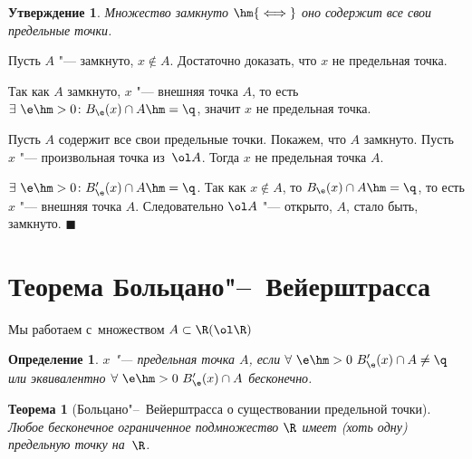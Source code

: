 \documentclass[a4paper,10pt,twoside]{article}
\newtheorem{Def}{Определение}[section]
\newtheorem{The}{Теорема}[section]
\newtheorem{Ut}{Утверждение}[section]
\newenvironment{Proof}
       {\par\noindent{\textbf{Доказательство.}}}
       {\hfill$\scriptstyle\blacksquare$}
\let\AVsection\section{}
\renewcommand\section{\newpage\scol\AVsection}
\newcommand{\scol}{  \renewcommand{\headrulewidth}{0.5pt}\fancyhead[RE,LO]{\thesection{} \leftmark} \fancyhead[LE,RO]{\thepage}}
\begin{document}
 \begin{Ut}
Множество замкнуто $\hm{\iff}$ оно содержит все свои предельные точки.
 \end{Ut}

 \begin{Proof}
Пусть $A$ "--- замкнуто, $x\nin A$. Достаточно доказать, что $x$ не предельная точка.

Так как $A$ замкнуто, $x$ "--- внешняя точка $A$, то есть
 $\exists\ \e\hm>0\colon B_\e(x)\cap A\hm=\q$, значит $x$ не предельная точка.

 Пусть $A$ содержит все свои предельные точки. Покажем, что $A$ замкнуто.
 Пусть $x$ "--- произвольная точка из~$\ol A$. Тогда $x$ не предельная точка $A$.

 $\exists\ \e\hm>0\colon B'_\e(x)\cap A\hm=\q$. Так как $x\nin A$, то $B_\e(x)\cap A\hm=\q$, то есть $x$ "--- внешняя точка $A$. Следовательно $\ol A$ "--- открыто, $A$, стало быть, замкнуто.
 \end{Proof}

 \section{Теорема Больцано"--~Вейерштрасса}

 Мы работаем с~множеством $A\subset\R(\ol\R)$

 \begin{Def}
$x$ "--- предельная точка $A$, если $\forall\ \e\hm>0\ B'_\e(x)\cap A\neq \q$ или эквивалентно $\forall\  \e\hm>0\ B'_\e(x)\cap A$ бесконечно.
 \end{Def}

 \begin{The}[Больцано"--~Вейерштрасса о существовании предельной точки]\label{bolc} Любое бесконечное ограниченное подмножество  $\R$ имеет (хоть одну) предельную точку на~$\R$.
\end{The}
\end{document}
